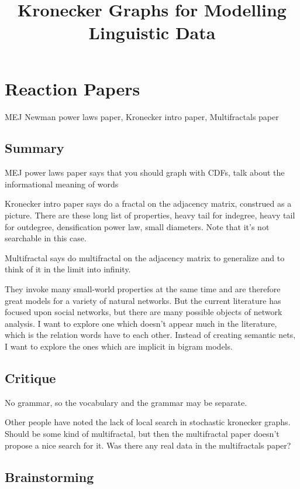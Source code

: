 \documentclass[12pt]{article}
\begin{document}
\title{Kronecker Graphs for Modelling Linguistic Data}

\section{Reaction Papers}

MEJ Newman power laws paper, Kronecker intro paper, Multifractals paper

\subsection{Summary}
MEJ power laws paper says that you should graph with CDFs, talk about the informational meaning of words

Kronecker intro paper says do a fractal on the adjacency matrix, construed as a picture. There are these long list of properties, heavy tail for indegree, heavy tail for outdegree, densification power law, small diameters. Note that it's not searchable in this case.

Multifractal says do multifractal on the adjacency matrix to generalize and to think of it in the limit into infinity.

They invoke many small-world properties at the same time and are therefore great models for a variety of natural networks. But the current literature has focused upon social networks, but there are many possible objects of network analysis. I want to explore one which doesn't appear much in the literature, which is the relation words have to each other. Instead of creating semantic nets, I want to explore the ones which are implicit in bigram models.

\subsection{Critique}
No grammar, so the vocabulary and the grammar may be separate.

Other people have noted the lack of local search in stochastic kronecker graphs.
Should be some kind of multifractal, but then the multifractal paper doesn't propose a nice search for it. Was there any real data in the multifractals paper?
\subsection{Brainstorming}
\end{document}

